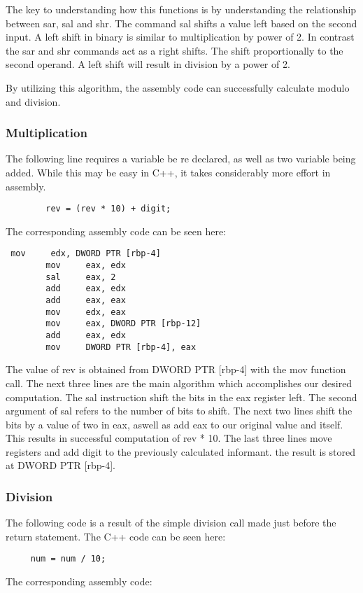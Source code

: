 \documentclass{article}
\theoremstyle{theorem}
\theoremstyle{definition}
\theoremstyle{remark}
\begin{document}
The key to understanding how this functions is by understanding the relationship between sar, sal and shr. The command sal shifts a value left based on the second input. A left shift in binary is similar to multiplication by power of 2. In contrast the sar and shr commands act as a right shifts. The shift proportionally to the second operand.  A left shift will result in division by a power of 2.

By utilizing this algorithm, the assembly code can successfully calculate modulo and division.
        
\subsubsection{{Multiplication}}
The following line requires a variable be re declared, as well as two variable being added. While this may be easy in C++, it takes considerably more effort in assembly.
\begin{lstlisting}
        rev = (rev * 10) + digit; 
\end{lstlisting}    
The corresponding assembly code can be seen here:
\begin{lstlisting}
 mov     edx, DWORD PTR [rbp-4] 
        mov     eax, edx 
        sal     eax, 2 
        add     eax, edx
        add     eax, eax
        mov     edx, eax
        mov     eax, DWORD PTR [rbp-12]
        add     eax, edx
        mov     DWORD PTR [rbp-4], eax
\end{lstlisting}

The value of rev is obtained from DWORD PTR [rbp-4] with the mov function call. The next three lines are the main algorithm which accomplishes our desired computation. The sal instruction shift the bits in the eax register left. The second argument of sal refers to the number of bits to shift. The next two lines shift the bits by a value of two in eax, aswell as add eax to our original value and itself. This results in successful computation of rev * 10. The last three lines move registers and add digit to the previously calculated informant. the result is stored at DWORD PTR [rbp-4].
     
     
\subsubsection{Division}
The following code is a result of the simple division call made just before the return statement. The C++ code can be seen here:

\begin{lstlisting}
     num = num / 10;
\end{lstlisting}
The corresponding assembly code:
\end{document}
